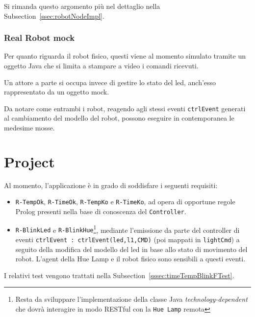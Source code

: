 \documentclass{../llncs}
\newcommand{\codescript}[1]{{\mbox{\small{\texttt{#1}}}}\xspace}
\newcommand{\code}[1]{{\color{blue}\small{\texttt{#1}}}}
\newcommand{\labelsec}[1]{\label{sec:#1}}
\newcommand{\xss}[1]{\subsectionname~\ref{ssec:#1}}
\newcommand{\xsss}[1]{\subsectionname~\ref{sssec:#1}}
\newcommand{\subsectionname}{Subsection}
\begin{document}
Si rimanda questo argomento più nel dettaglio nella \xss{robotNodeImpl}.

\subsubsection{Real Robot mock}
Per quanto riguarda il robot fisico, questi viene al momento simulato tramite un oggetto Java che si limita a stampare a video i comandi ricevuti.

Un attore a parte si occupa invece di gestire lo stato del led, anch'esso rappresentato da un oggetto mock.\\



\vspace{8px}

Da notare come entrambi i robot, reagendo agli stessi eventi \codescript{ctrlEvent} generati al cambiamento del modello del robot, possono eseguire in contemporanea le medesime mosse.

\section{Project}
\labelsec{Project}
Al momento, l'applicazione è in grado di soddisfare i seguenti requisiti:
\begin{itemize}
\item \code{R-TempOk}, \code{R-TimeOk}, \code{R-TempKo} e \code{R-TimeKo}, ad opera di opportune regole Prolog presenti nella base di conoscenza del \texttt{Controller}.
\item \code{R-BlinkLed} e \code{R-BlinkHue}\footnote{Resta da sviluppare l'implementazione della classe Java \emph{technology-dependent} che dovrà interagire in modo RESTful con la \texttt{Hue Lamp} remota}, mediante l'emissione da parte del controller di eventi \codescript{ctrlEvent : ctrlEvent(led,l1,CMD)} (poi mappati in \codescript{lightCmd}) a seguito della modifica del modello del led in base allo stato di movimento del robot. L'agent della Hue Lamp e il robot fisico sono sensibili a questi eventi.
\end{itemize}

I relativi test vengono trattati nella \xsss{timeTempBlinkFTest}.\\
\end{document}
